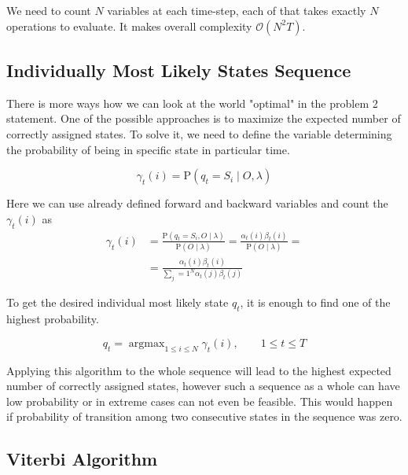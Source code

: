 \documentclass[thesis=M,english]{FITthesis}[2012/10/20]
\newcommand{\argmax}{\mathop{\mathrm{argmax}}}
\begin{document}
We need to count $N$ variables at each time-step, each of that takes exactly $N$ operations to evaluate. It makes overall complexity $\mathcal{O}(N^2T)$.    

\subsection{Individually Most Likely States Sequence}
There is more ways how we can look at the world "optimal" in the problem 2 statement. One of the possible approaches is to maximize the expected number of correctly assigned states. To solve it, we need to define the variable determining the probability of being in specific state in particular time.

\begin{equation}
\gamma_t(i) = \mathrm{P}(q_t = S_i \mid O,\lambda ) 
\end{equation}

Here we can use already defined forward and backward variables and count the $\gamma_t(i)$ as
\begin{equation}
\begin{aligned}
\gamma_t(i) &= \frac{ \mathrm{P}( q_t = S_i, O \mid \lambda )}{ \mathrm{P}( O \mid \lambda )} =
               \frac{  \alpha_t(i) \beta_t(i) }{ \mathrm{P}( O \mid \lambda )} = \\
            &= \frac{  \alpha_t(i) \beta_t(i) }{ \sum_j=1^N \alpha_t(j) \beta_t(j) } 
\end{aligned}
\end{equation}

To get the desired individual most likely state $q_t$, it is enough to find one of the highest probability.

\begin{equation}
q_t = \argmax_{1 \leq i \leq N} \gamma_t(i), \qquad 1 \leq t \leq T
\end{equation} 

Applying this algorithm to the whole sequence will lead to the highest expected number of correctly assigned states, however such a sequence as a whole can have low probability or in extreme cases can not even be feasible. This would happen if probability of transition among two consecutive states in the sequence was zero.   
   
\subsection{Viterbi Algorithm} 
\end{document}
